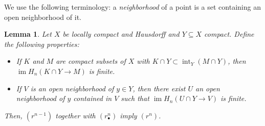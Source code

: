 \documentclass{amsart}
\newtheorem{lemma}[theorem]{Lemma}
\theoremstyle{definition}
\DeclareMathOperator{\im}{im}
\DeclareMathOperator{\interior}{int}
\begin{document}
	
	
	
	
	
	
	
	
	
	
	
	
	
	
	
	
	
	
	
	
	
	
	
	
	
	\newpage
	
	We use the following terminology: a \textit{neighborhood} of a point is a set containing an open neighborhood of it.
	
	\begin{lemma} \label{l: wilder}
		Let $X$ be locally compact and Hausdorff and $Y \subseteq X$ compact. Define the following properties:
		\begin{itemize}
			\item[$(r^n)$] If $K$ and $M$ are compact subsets of $X$ with $K \cap Y \subset \interior_Y(M \cap Y)$, then $\im H_n\left(K \cap Y \to M\right)$ is finite.
			\item[$(r^n_\bullet)$] If $V$ is an open neighborhood of $y \in Y$, then there exist $U$ an open neighborhood of $y$ contained in $V$ such that $\im H_n\left(U \cap Y \to V\right)$ is finite.
		\end{itemize}
		Then, $(r^{n-1})$ together with $(r^n_\bullet)$ imply $(r^n)$.
	\end{lemma}
	
\end{document}

